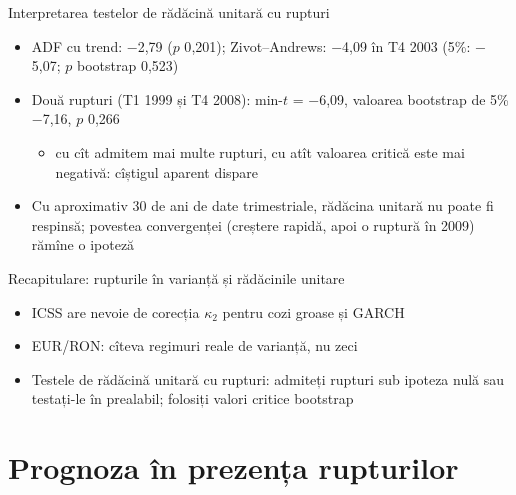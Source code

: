 \begin{frame}{Interpretarea testelor de rădăcină unitară cu rupturi}
\itemsize{\small}
\begin{itemize}
    \item ADF cu trend: \ensuremath{-}2{,}79 ($p$ 0{,}201); Zivot--Andrews: \ensuremath{-}4{,}09 în T4 2003 (5\%: \ensuremath{-}5{,}07; $p$ bootstrap 0{,}523)
    \item Două rupturi (T1 1999 și T4 2008): min-$t$ = \ensuremath{-}6{,}09, valoarea bootstrap de 5\% \ensuremath{-}7{,}16, $p$ 0{,}266
    \begin{itemize}
        \item cu cît admitem mai multe rupturi, cu atît valoarea critică este mai negativă: cîștigul aparent dispare
    \end{itemize}
    \item Cu aproximativ 30 de ani de date trimestriale, rădăcina unitară nu poate fi respinsă; povestea convergenței (creștere rapidă, apoi o ruptură în 2009) rămîne o ipoteză
\end{itemize}
\end{frame}

\begin{frame}{Recapitulare: rupturile în varianță și rădăcinile unitare}
\itemsize{\small}
\begin{itemize}
    \item ICSS are nevoie de corecția $\kappa_2$ pentru cozi groase și GARCH
    \item EUR/RON: cîteva regimuri reale de varianță, nu zeci
    \item Testele de rădăcină unitară cu rupturi: admiteți rupturi sub ipoteza nulă sau testați-le în prealabil; folosiți valori critice bootstrap
\end{itemize}
\end{frame}


\section{Prognoza în prezența rupturilor}

